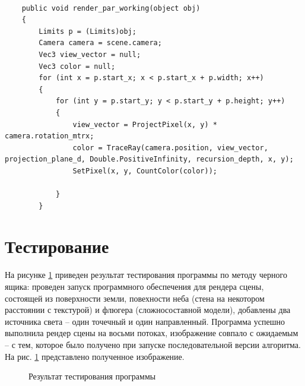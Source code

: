 \begin{lstlisting}[caption=Реализация рабочего потока параллельного алгоритма трассировки лучей,
	label={tras_work}]

	public void render_par_working(object obj)
	{
		Limits p = (Limits)obj;
		Camera camera = scene.camera;
		Vec3 view_vector = null;
		Vec3 color = null;
		for (int x = p.start_x; x < p.start_x + p.width; x++)
		{
			for (int y = p.start_y; y < p.start_y + p.height; y++)
			{
				view_vector = ProjectPixel(x, y) * camera.rotation_mtrx;
				color = TraceRay(camera.position, view_vector, projection_plane_d, Double.PositiveInfinity, recursion_depth, x, y);
				SetPixel(x, y, CountColor(color));
				
			}
		}
\end{lstlisting}

\section{Тестирование}

На рисунке \ref{fig:work_example} приведен результат тестирования программы по методу черного ящика: проведен запуск программного обеспечения для рендера сцены, состоящей из поверхности земли, повехности неба (стена на некотором расстоянии с текстурой) и флюгера (сложносоставной модели), добавлены два источника света -- один точечный и один направленный. Программа успешно выполнила рендер сцены на восьми потоках, изображение совпало с ожидаемым -- с тем, которое было получено при запуске последовательной версии алгоритма. На рис. \ref{fig:work_example} представлено полученное изображение.

\newpage
\begin{figure}[h!]
	
	
	\caption{Результат тестирования программы}
	
	\label{fig:work_example}
	
\end{figure}


